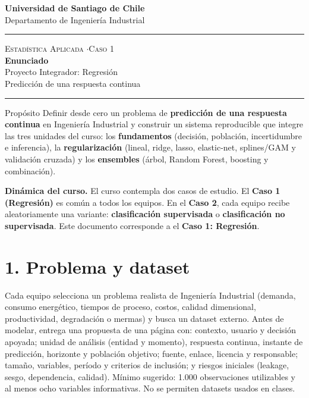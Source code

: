 \documentclass[11pt,letterpaper]{article}
\newcommand{\hrulethin}{\noindent\rule{\textwidth}{0.6pt}}
\begin{document}
\pagestyle{plain}
\begin{center}
    \textbf{\large Universidad de Santiago de Chile}\\[0.1cm]
    Departamento de Ingeniería Industrial
\end{center}
\vspace{0.15cm}\hrulethin\vspace{0.35cm}
\begin{center}
    {\scshape Estadística Aplicada \quad$\cdot$\quad Caso 1}\\[0.35cm]
    {\LARGE \textbf{Enunciado}}\\[0.15cm]
    {\large Proyecto Integrador: Regresión}\\[0.2cm]
    Predicción de una respuesta continua
\end{center}
\vspace{0.2cm}\hrulethin\vspace{0.4cm}
\begin{propbox}{Propósito}
Definir desde cero un problema de \textbf{predicción de una respuesta continua} en Ingeniería Industrial y
construir un sistema reproducible que integre las tres unidades del curso: los \textbf{fundamentos} (decisión,
población, incertidumbre e inferencia), la \textbf{regularización} (lineal, ridge, lasso, elastic-net,
splines/GAM y validación cruzada) y los \textbf{ensembles} (árbol, Random Forest, boosting y combinación).
\end{propbox}

\textbf{Dinámica del curso.} El curso contempla dos casos de estudio. El \textbf{Caso 1 (Regresión)} es común a todos los equipos. En el \textbf{Caso 2}, cada equipo recibe aleatoriamente una variante: \textbf{clasificación supervisada} o \textbf{clasificación no supervisada}. Este documento corresponde a el \textbf{Caso 1: Regresión}.

\section*{1. Problema y dataset}
Cada equipo selecciona un problema realista de Ingeniería Industrial (demanda, consumo energético, tiempos de proceso, costos, calidad dimensional, productividad, degradación o mermas) y busca un dataset externo. Antes de modelar, entrega una propuesta de una página con: contexto, usuario y decisión apoyada; unidad de análisis (entidad y momento), respuesta continua, instante de predicción, horizonte y población objetivo; fuente, enlace, licencia y responsable; tamaño, variables, período y criterios de inclusión; y riesgos iniciales (leakage, sesgo, dependencia, calidad). Mínimo sugerido: 1.000 observaciones utilizables y al menos ocho variables informativas. No se permiten datasets usados en clases.
\end{document}
